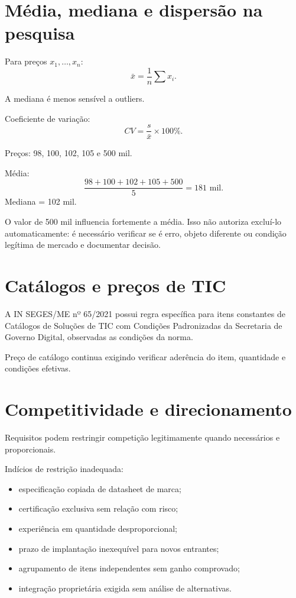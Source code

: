 \section{Média, mediana e dispersão na pesquisa}

Para preços $x_1,\ldots,x_n$:
\[
\bar{x}=\frac{1}{n}\sum x_i.
\]

A mediana é menos sensível a outliers.

Coeficiente de variação:
\[
CV=\frac{s}{\bar{x}}\times100\%.
\]

\begin{exemplo}[outlier]
Preços: 98, 100, 102, 105 e 500 mil.

Média:
\[
\frac{98+100+102+105+500}{5}=181\text{ mil}.
\]
Mediana = 102 mil.

O valor de 500 mil influencia fortemente a média. Isso não autoriza excluí-lo automaticamente: é necessário verificar se é erro, objeto diferente ou condição legítima de mercado e documentar decisão.
\end{exemplo}

\section{Catálogos e preços de TIC}

A IN SEGES/ME nº 65/2021 possui regra específica para itens constantes de Catálogos de Soluções de TIC com Condições Padronizadas da Secretaria de Governo Digital, observadas as condições da norma.

Preço de catálogo continua exigindo verificar aderência do item, quantidade e condições efetivas.

\section{Competitividade e direcionamento}

Requisitos podem restringir competição legitimamente quando necessários e proporcionais.

Indícios de restrição inadequada:
\begin{itemize}
\item especificação copiada de datasheet de marca;
\item certificação exclusiva sem relação com risco;
\item experiência em quantidade desproporcional;
\item prazo de implantação inexequível para novos entrantes;
\item agrupamento de itens independentes sem ganho comprovado;
\item integração proprietária exigida sem análise de alternativas.
\end{itemize}

